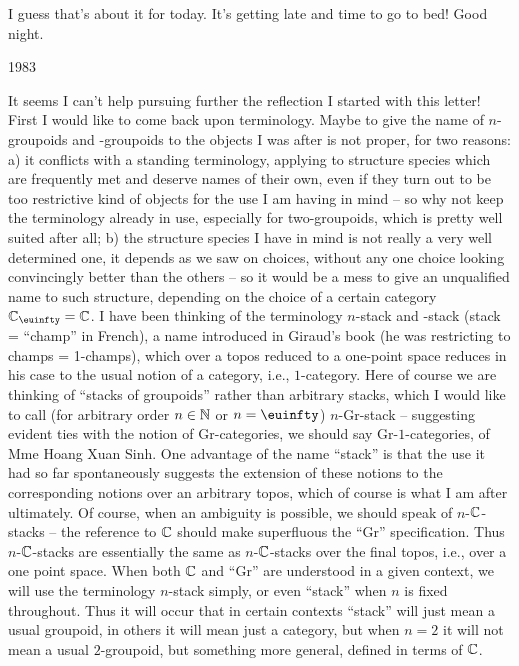 I guess that's about it for today. It's getting late and time to go to
bed! Good night.

\bigbreak

\presectionfill{}1983\par

\label{sec:13}%
It seems I can't help pursuing further the reflection I started with
this letter! First I would like to come back upon terminology. Maybe
to give the name of $n$-groupoids and \oo-groupoids to the objects I
was after is not proper, for two reasons: a) it conflicts with a
standing terminology, applying to structure species which are
frequently met and deserve names of their own, even if they turn out
to be too restrictive kind of objects for the use I am having in mind
-- so why not keep the terminology already in use, especially for
two-groupoids, which is pretty well suited after all; b) the structure
species I have in mind is not really a very well determined one, it
depends as we saw on choices, without any one choice looking
convincingly better than the others -- so it would be a mess to give
an unqualified name to such structure, depending on the choice of a
certain category $\bC_\oo = \bC$. I have been thinking of the
terminology $n$-stack and \oo-stack (stack = ``champ'' in French), a
name introduced in Giraud's book (he was restricting to champs =
1-champs), which over a topos reduced to a one-point space reduces in
his case to the usual notion of a category, i.e., $1$-category. Here
of course we are thinking of ``stacks of groupoids'' rather than
arbitrary stacks, which I would like to call (for arbitrary order
$n\in{\ensuremath{\mathbb{N}}}$ or $n=\oo$) $n$-Gr-stack -- suggesting evident ties with the
notion of Gr-categories, we should say Gr-$1$-categories, of Mme Hoang
Xuan Sinh. One advantage of the name ``stack'' is that the use it had
so far spontaneously suggests the extension of these notions to the
corresponding notions over an arbitrary topos, which of course is what
I am after ultimately. Of course, when an ambiguity is possible, we
should speak of $n$-${\mathbb{C}}$-stacks -- the reference to ${\mathbb{C}}$
should make superfluous the ``Gr'' specification. Thus $n$-${\mathbb{C}}$-stacks
are essentially the same as $n$-${\mathbb{C}}$-stacks over the
final topos, i.e., over a one point space. When both ${\mathbb{C}}$ and
``Gr'' are understood in a given context, we will use the terminology
$n$-stack simply, or even ``stack'' when $n$ is fixed throughout. Thus
it will occur that in certain contexts ``stack'' will just mean a
usual groupoid, in others it will mean just a category, but when $n=2$
it will not mean a usual $2$-groupoid, but something more general,
defined in terms of ${\mathbb{C}}$.

